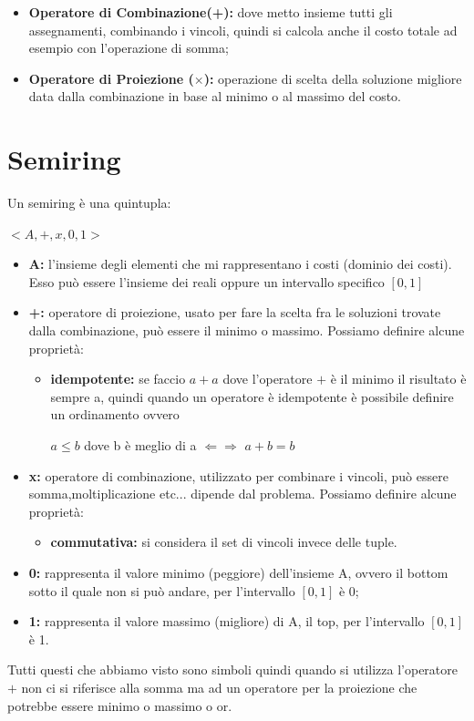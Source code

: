 \begin{itemize}
    \item \textbf{Operatore di Combinazione(+):} dove metto insieme tutti gli
          assegnamenti, combinando i vincoli, quindi si calcola anche il costo totale
          ad esempio con l'operazione di somma;
    \item \textbf{Operatore di Proiezione ($\times$):} operazione di scelta della
          soluzione migliore data dalla combinazione in base al minimo o al massimo
          del costo.
\end{itemize}

\section{Semiring}
Un semiring è una quintupla:
\begin{center}
    $<A, +, x, 0, 1>$
\end{center}
\begin{itemize}
    \item \textbf{A:} l'insieme degli elementi che mi rappresentano i costi
          (dominio dei costi). Esso può essere l'insieme dei reali oppure un
          intervallo specifico $[0,1]$
    \item \textbf{+:} operatore di proiezione, usato per fare la scelta fra le
          soluzioni trovate dalla combinazione, può essere il minimo o massimo.
          Possiamo definire alcune proprietà:
          \begin{itemize}
              \item \textbf{idempotente:} se faccio $a+a$ dove l'operatore $+$ è il
                    minimo il risultato è sempre a, quindi quando un operatore è
                    idempotente è possibile definire un ordinamento ovvero
                    \begin{center}
                        $a \leq b$ dove b è meglio di a $\Leftarrow \Rightarrow$
                        $a + b = b$
                    \end{center}
          \end{itemize}
    \item \textbf{x:} operatore di combinazione, utilizzato per combinare i
          vincoli, può essere somma,moltiplicazione etc... dipende dal problema.
          Possiamo definire alcune proprietà:
          \begin{itemize}
              \item \textbf{commutativa:} si considera il set di vincoli invece
                    delle tuple.
          \end{itemize}
    \item \textbf{0:} rappresenta il valore minimo (peggiore) dell'insieme A,
          ovvero il bottom sotto il quale non si può andare, per l'intervallo $[0,1]$
          è 0;
    \item \textbf{1:} rappresenta il valore massimo (migliore) di A, il top, per
          l'intervallo $[0,1]$ è 1.
\end{itemize}
Tutti questi che abbiamo visto sono simboli quindi quando si utilizza
l'operatore $+$ non ci si riferisce alla somma ma ad un operatore per la
proiezione che potrebbe essere minimo o massimo o or.
